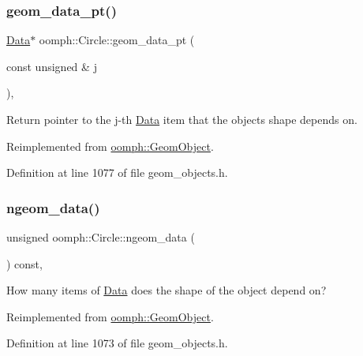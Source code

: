 \subsubsection{\texorpdfstring{geom\+\_\+data\+\_\+pt()}{geom\_data\_pt()}}
{\footnotesize\ttfamily \hyperlink{classoomph_1_1Data}{Data}$\ast$ oomph\+::\+Circle\+::geom\+\_\+data\+\_\+pt (\begin{DoxyParamCaption}\item[{const unsigned \&}]{j }\end{DoxyParamCaption})\hspace{0.3cm}{\ttfamily [inline]}, {\ttfamily [virtual]}}



Return pointer to the j-\/th \hyperlink{classoomph_1_1Data}{Data} item that the object\textquotesingle{}s shape depends on. 



Reimplemented from \hyperlink{classoomph_1_1GeomObject_ae1940fc6a3050e645c3882f2f6f3a202}{oomph\+::\+Geom\+Object}.



Definition at line 1077 of file geom\+\_\+objects.\+h.

\mbox{\label{classoomph_1_1Circle_a69d37777c2d4e7e13431a1a1e7f31ad5}} 
\subsubsection{\texorpdfstring{ngeom\+\_\+data()}{ngeom\_data()}}
{\footnotesize\ttfamily unsigned oomph\+::\+Circle\+::ngeom\+\_\+data (\begin{DoxyParamCaption}{ }\end{DoxyParamCaption}) const\hspace{0.3cm}{\ttfamily [inline]}, {\ttfamily [virtual]}}



How many items of \hyperlink{classoomph_1_1Data}{Data} does the shape of the object depend on? 



Reimplemented from \hyperlink{classoomph_1_1GeomObject_a19d325347e19964e127fe124df56f251}{oomph\+::\+Geom\+Object}.



Definition at line 1073 of file geom\+\_\+objects.\+h.

